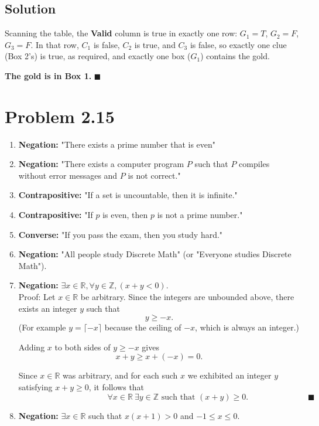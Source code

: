 \documentclass[12pt]{article}
\begin{document}
\subsection*{Solution}
Scanning the table, the \textbf{Valid} column is true in exactly one row: $G_1 = T$, $G_2 = F$, $G_3 = F$. In that row, $C_1$ is false, $C_2$ is true, and $C_3$ is false, so exactly one clue (Box 2's) is true, as required, and exactly one box ($G_1$) contains the gold.
 
\medskip
\noindent\textbf{The gold is in Box 1.} \hfill $\blacksquare$

\section*{Problem 2.15}

\begin{enumerate}
    \renewcommand{\labelenumi}{\alph{enumi})}
    \item \textbf{Negation:} "There exists a prime number that is even"
    
    \item \textbf{Negation:} "There exists a computer program $P$ such that $P$ compiles without error messages and $P$ is not correct."
    \item \textbf{Contrapositive:} "If a set is uncountable, then it is infinite."
    \item \textbf{Contrapositive:} "If $p$ is even, then $p$ is not a prime number."
    
    \item \textbf{Converse:} "If you pass the exam, then you study hard."  
    \item \textbf{Negation:} "All people study Discrete Math" (or "Everyone studies Discrete Math").
    
    \item \textbf{Negation:} $\exists x \in \mathbb{R}, \forall y \in \mathbb{Z}, (x + y < 0)$.\\
    Proof: Let $x \in \mathbb{R}$ be arbitrary. Since the integers are unbounded above, there exists an integer $y$ such that
$$y \ge -x.$$
(For example $y = \lceil -x \rceil$ because the ceiling of $-x$, which is always an integer.)
 
Adding $x$ to both sides of $y \ge -x$ gives
$$x + y \ge x + (-x) = 0.$$
 

Since $x \in \mathbb{R}$ was arbitrary, and for each such $x$ we exhibited an integer $y$ satisfying $x + y \ge 0$, it follows that
$$\;\;\;\;\;\;\;\;\;\;\;\;\;\;\;\;\;\;\;\;\;\;\;\;\;\;\;\;\;\;\;\;\;\;\;\;\;\;\; \forall x \in \mathbb{R}\ \exists y \in \mathbb{Z} \text{ such that } (x+y) \ge 0. \;\;\;\;\;\;\;\;\;\;\;\;\;\;\;\;\;\;\;\qquad \blacksquare$$

    \item \textbf{Negation:} $\exists x \in \mathbb{R}$ such that $x(x + 1) > 0$ and $-1 \le x \le 0$.
\end{enumerate}
\end{document}
